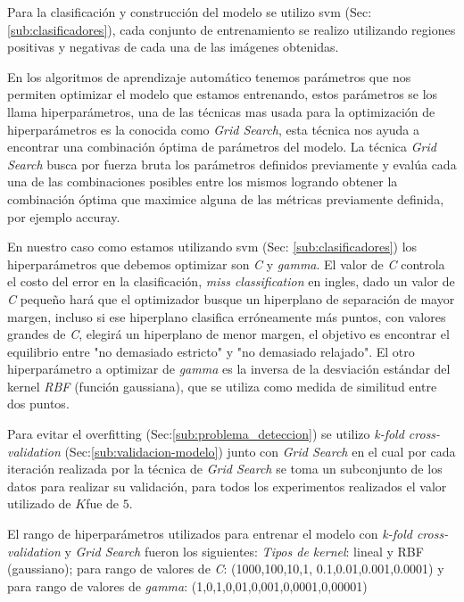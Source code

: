 Para la clasificación y construcción del modelo se utilizo \ac{svm} (Sec: \ref{sub:clasificadores}), cada conjunto de entrenamiento se realizo utilizando regiones positivas y negativas de cada una de las imágenes obtenidas.

En los algoritmos de aprendizaje automático tenemos parámetros que nos permiten optimizar el modelo que estamos entrenando, estos  parámetros se los llama hiperparámetros, una de las técnicas mas usada para la optimización de hiperparámetros es la conocida como \textit{Grid Search}, esta técnica nos ayuda a encontrar una combinación óptima de parámetros del modelo. La técnica \textit{Grid Search} busca por fuerza bruta los parámetros definidos previamente y evalúa cada una de las combinaciones posibles entre los mismos logrando obtener la combinación óptima que maximice alguna de las métricas previamente definida, por ejemplo accuray. 

En nuestro caso como estamos utilizando \ac{svm} (Sec: \ref{sub:clasificadores}) los hiperparámetros que debemos optimizar son \textit{C} y \textit{gamma}. El valor de \textit{C} controla el costo del error en la clasificación, \textit{miss classification} en ingles, dado un valor de \textit{C} pequeño hará que el optimizador busque un hiperplano de separación de mayor margen, incluso si ese hiperplano clasifica erróneamente más puntos, con valores grandes de \textit{C},  elegirá un hiperplano de menor margen, el objetivo es encontrar el equilibrio entre "no demasiado estricto" y  "no demasiado relajado". El otro hiperparámetro a  optimizar de  \textit{gamma} es la inversa de la desviación estándar del kernel \textit{RBF} (función gaussiana), que se utiliza como medida de similitud entre dos puntos.

Para evitar el overfitting (Sec:\ref{sub:problema_deteccion}) se utilizo \textit{k-fold cross-validation} (Sec:\ref{sub:validacion-modelo}) junto con \textit{Grid Search} en el cual por cada iteración realizada por la técnica de \textit{Grid Search} se toma un subconjunto de los datos para realizar su validación, para todos los experimentos realizados el valor utilizado de $K$fue de $5$.

El rango de hiperparámetros utilizados para entrenar el modelo con  \textit{k-fold cross-validation} y \textit{Grid Search} fueron los siguientes: \textit{Tipos de kernel}: lineal y RBF (gaussiano); para rango de valores de \textit{C}: (1000,100,10,1, 0.1,0.01,0.001,0.0001)
    y para rango de valores de \textit{gamma}: (1,0,1,0,01,0,001,0,0001,0,00001)

